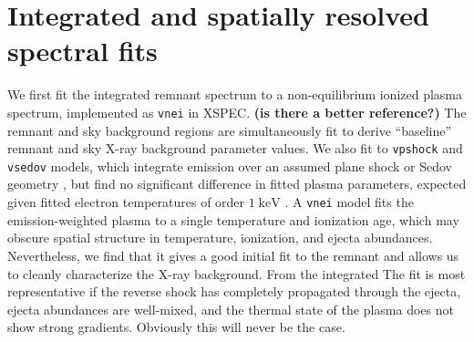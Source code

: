 \documentclass[preprint2,tighten,trackchanges]{aastex6}
\newcommand*{\mt}{\mathrm}
\newcommand*{\unit}[1]{\;\mt{#1}}  %
\newcommand*{\abt}{\mathord{\sim}} %
\begin{document}
\section{Integrated and spatially resolved spectral fits} \label{sec:spec}

\begin{figure*}[]
    \label{fig:regs}  %
\end{figure*}

We first fit the integrated remnant spectrum to a non-equilibrium ionized
plasma spectrum, implemented as \texttt{vnei} \citep{hamilton1983} in XSPEC.
\textbf{(is there a better reference?)}
The remnant and sky background regions are simultaneously fit
to derive ``baseline'' remnant and sky X-ray background parameter values.
We also fit to \texttt{vpshock} and \texttt{vsedov} models, which integrate
emission over an assumed plane shock or Sedov geometry \citep{borkowski2001},
but find no significant difference in fitted plasma parameters, expected given
fitted electron temperatures of order $1 \unit{keV}$ \citep{borkowski2001}.
A \texttt{vnei} model fits the emission-weighted plasma to a single temperature
and ionization age, which may obscure spatial structure in temperature,
ionization, and ejecta abundances.
Nevertheless, we find that it gives a good initial fit to the remnant and
allows us to cleanly characterize the X-ray background.
From the integrated
The fit is most representative if the reverse shock has completely propagated
through the ejecta, ejecta abundances are well-mixed, and the thermal state of
the plasma does not show strong gradients.
Obviously this will never be the case.

\end{document}
